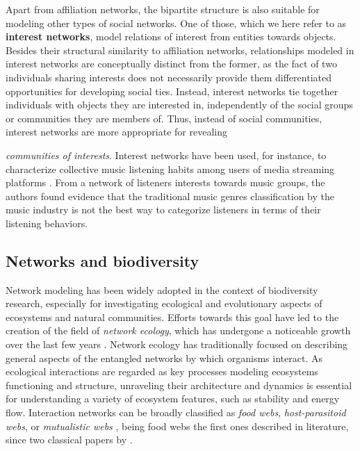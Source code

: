 Apart from affiliation networks, the bipartite structure is also suitable for modeling other types of social networks.
One of those, which we here refer to as \textbf{interest networks}, model relations of interest from entities towards objects.
Besides their structural similarity to affiliation networks, relationships modeled in interest networks are conceptually distinct from the former, as the fact of two individuals sharing interests does not necessarily provide them differentiated opportunities for developing social ties.
Instead, interest networks tie together individuals with objects they are interested in, independently of the social groups or communities they are members of. 
Thus, instead of social communities, interest networks are more appropriate for revealing {\textit{communities of interests}.
%
Interest networks have been used, for instance, to characterize collective music listening habits among users of media streaming platforms \cite{Lambiotte2005}.
From a network of listeners interests towards music groups, the authors found evidence that the traditional music genres classification by the music industry is not the best way to categorize listeners in terms of their listening behaviors.

\subsection{Networks and biodiversity}
Network modeling has been widely adopted in the context of biodiversity research, especially for investigating ecological and evolutionary aspects of ecosystems and natural communities. 
Efforts towards this goal have led to the creation of the field of \textit{network ecology}, which has undergone a noticeable growth over the last few years \cite{Borrett2014}.
Network ecology has traditionally focused on describing general aspects of the entangled networks by which organisms interact.
As ecological interactions are regarded as key processes modeling ecosystems functioning and structure, unraveling their architecture and dynamics is essential for understanding a variety of ecosystem features, such as stability and energy flow.
%
Interaction networks can be broadly classified as \textit{food webs}, \textit{host-parasitoid webs}, or \textit{mutualistic webs} \cite{Ings2009}, being food webs the first ones described in literature, since two classical papers by . 
%

}
